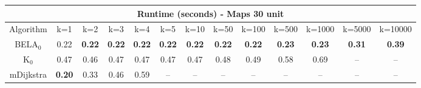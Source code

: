 \begin{tabular}{c|cccccccccccc}\toprule
\multicolumn{13}{c}{Runtime (seconds) - Maps 30 unit}\\ \midrule
Algorithm & k=1 & k=2 & k=3 & k=4 & k=5 & k=10 & k=50 & k=100 & k=500 & k=1000 & k=5000 & k=10000 \\ \midrule
BELA$_0$ & 0.22 & \textbf{0.22} & \textbf{0.22} & \textbf{0.22} & \textbf{0.22} & \textbf{0.22} & \textbf{0.22} & \textbf{0.22} & \textbf{0.23} & \textbf{0.23} & \textbf{0.31} & \textbf{0.39} \\
K$_0$ & 0.47 & 0.46 & 0.47 & 0.47 & 0.47 & 0.47 & 0.48 & 0.49 & 0.58 & 0.69 & -- & -- \\
mDijkstra & \textbf{0.20} & 0.33 & 0.46 & 0.59 & -- & -- & -- & -- & -- & -- & -- & -- \\ \bottomrule 
\end{tabular}
